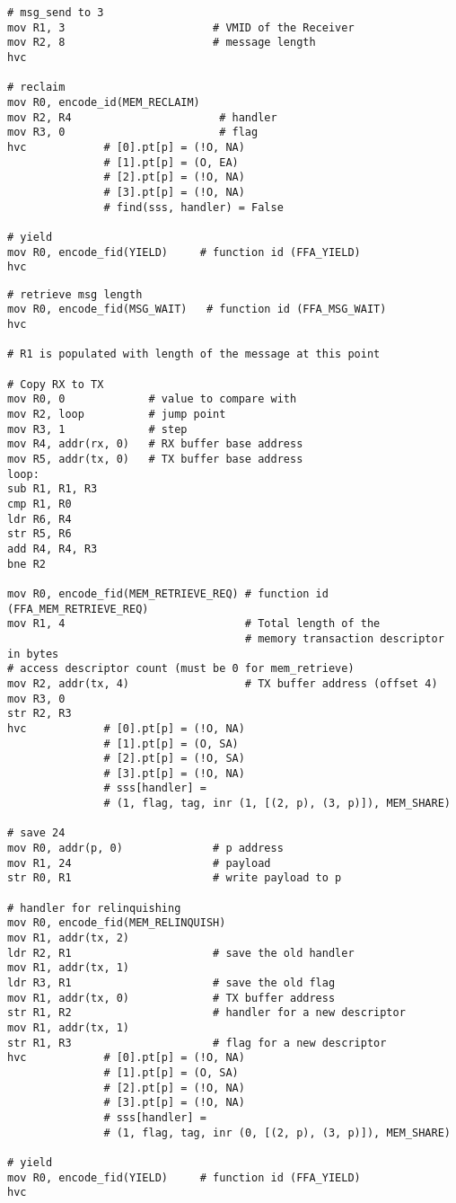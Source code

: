 \documentclass{article}
\begin{document}
\begin{lstlisting}[caption={VM 1}]
# msg_send to 3
mov R1, 3                       # VMID of the Receiver
mov R2, 8                       # message length
hvc

# reclaim
mov R0, encode_id(MEM_RECLAIM)
mov R2, R4                       # handler
mov R3, 0                        # flag
hvc            # [0].pt[p] = (!O, NA)
               # [1].pt[p] = (O, EA)
               # [2].pt[p] = (!O, NA)
               # [3].pt[p] = (!O, NA)
               # find(sss, handler) = False    
               
# yield
mov R0, encode_fid(YIELD)     # function id (FFA_YIELD)
hvc   
\end{lstlisting}

\begin{lstlisting}[caption={VM 2}]
# retrieve msg length
mov R0, encode_fid(MSG_WAIT)   # function id (FFA_MSG_WAIT)
hvc

# R1 is populated with length of the message at this point

# Copy RX to TX
mov R0, 0             # value to compare with
mov R2, loop          # jump point
mov R3, 1             # step
mov R4, addr(rx, 0)   # RX buffer base address
mov R5, addr(tx, 0)   # TX buffer base address
loop:
sub R1, R1, R3
cmp R1, R0
ldr R6, R4
str R5, R6
add R4, R4, R3
bne R2

mov R0, encode_fid(MEM_RETRIEVE_REQ) # function id (FFA_MEM_RETRIEVE_REQ)
mov R1, 4                            # Total length of the  
                                     # memory transaction descriptor in bytes
# access descriptor count (must be 0 for mem_retrieve)
mov R2, addr(tx, 4)                  # TX buffer address (offset 4)
mov R3, 0
str R2, R3                                    
hvc            # [0].pt[p] = (!O, NA)
               # [1].pt[p] = (O, SA)
               # [2].pt[p] = (!O, SA)
               # [3].pt[p] = (!O, NA)
               # sss[handler] = 
               # (1, flag, tag, inr (1, [(2, p), (3, p)]), MEM_SHARE)

# save 24
mov R0, addr(p, 0)              # p address
mov R1, 24                      # payload
str R0, R1                      # write payload to p

# handler for relinquishing
mov R0, encode_fid(MEM_RELINQUISH)
mov R1, addr(tx, 2)
ldr R2, R1                      # save the old handler
mov R1, addr(tx, 1)
ldr R3, R1                      # save the old flag
mov R1, addr(tx, 0)             # TX buffer address
str R1, R2                      # handler for a new descriptor
mov R1, addr(tx, 1)
str R1, R3                      # flag for a new descriptor
hvc            # [0].pt[p] = (!O, NA)
               # [1].pt[p] = (O, SA)
               # [2].pt[p] = (!O, NA)
               # [3].pt[p] = (!O, NA)
               # sss[handler] = 
               # (1, flag, tag, inr (0, [(2, p), (3, p)]), MEM_SHARE)

# yield
mov R0, encode_fid(YIELD)     # function id (FFA_YIELD)
hvc
\end{lstlisting}
\end{document}

